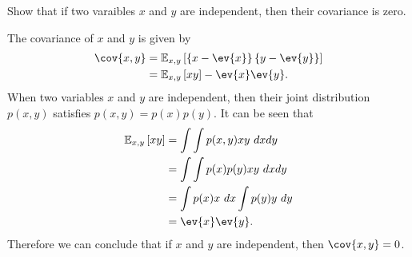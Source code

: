 \begin{question}{1.6}
	Show that if two varaibles $x$ and $y$ are independent, then their covariance is zero.
\end{question}

\begin{answer}{}
	The covariance of $x$ and $y$ is given by
	\begin{align}
		\cov{x, y} &= \mathbb{E}_{x,y}\left[\left\{x - \ev{x}\right\} \left\{y - \ev{y}\right\} \right]\\
		&= \mathbb{E}_{x,y}\left[xy\right] - \ev{x}\ev{y}.
	\end{align} 
	When two variables $x$ and $y$ are independent, then their joint distribution $p(x,y)$ satisfies $p(x,y) = p(x)p(y)$. It can be seen that
	\begin{align}
		\mathbb{E}_{x,y}\left[xy\right] &= \int\int p(x,y)xy\ dxdy\\
		&= \int\int p(x)p(y)xy\ dxdy\\
		&= \int p(x)x \ dx \int p(y)y\ dy\\
		&= \ev{x}\ev{y}.
	\end{align}
	Therefore we can conclude that if $x$ and $y$ are independent, then $\cov{x,y} = 0$.
\end{answer}